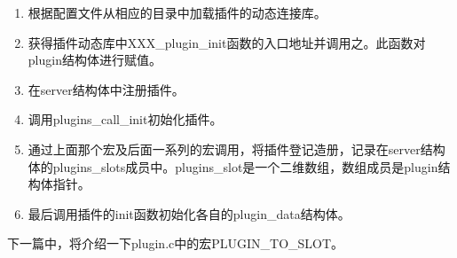 \documentclass[12pt, a4paper, dvipdfm]{book}
\begin{document}
\begin{enumerate}
	\item 根据配置文件从相应的目录中加载插件的动态连接库。
	\item 获得插件动态库中XXX\_plugin\_init函数的入口地址并调用之。此函数对plugin结构体进行赋值。
	\item 在server结构体中注册插件。
	\item 调用plugins\_call\_init初始化插件。
	\item 通过上面那个宏及后面一系列的宏调用，将插件登记造册，记录在server结构体的plugins\_slots成员中。plugins\_slot是一个二维数组，数组成员是plugin结构体指针。
	\item 最后调用插件的init函数初始化各自的plugin\_data结构体。
\end{enumerate}


	下一篇中，将介绍一下plugin.c中的宏PLUGIN\_TO\_SLOT。
\end{document}
